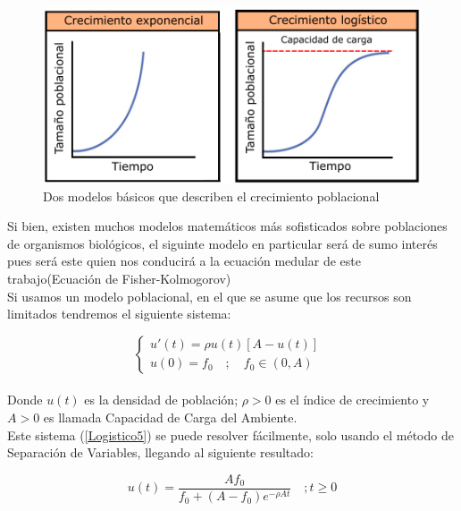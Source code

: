 \begin{center}
	\begin{figure}[H]
		\centering
		\includegraphics[scale=1]{marcoteorico/crecimientologistico.pdf}			
		\caption{{\small {\footnotesize Dos modelos básicos que describen el crecimiento poblacional}}}
	\end{figure}
\end{center}

Si bien, existen muchos modelos matemáticos más sofisticados sobre poblaciones de organismos biológicos, el siguinte modelo en particular será de sumo interés pues será este quien nos conducirá a la ecuación medular de este trabajo(Ecuación de Fisher-Kolmogorov)\\

Si usamos un modelo poblacional, en el que se asume que los recursos son limitados tendremos el siguiente sistema:

\begin{equation}
	\label{Logistico5}
	\begin{cases} u'(t)=\rho u(t)\left[ A-u(t) \right]  \\ u(0)={ f }_{ 0 }\quad ;{ \quad f }_{ 0 }\in \left( 0,A \right) \quad  \end{cases}
\end{equation}\\

Donde $u(t)$ es la densidad de población; $\rho>0 $ es el índice de crecimiento y $A>0$ es llamada Capacidad de Carga del Ambiente.\\

Este sistema (\ref{Logistico5}) se puede resolver fácilmente, solo usando el método de Separación de Variables, llegando al siguiente resultado:

\begin{equation}
	\label{Logistico6}
	u(t)=\dfrac { A{ f }_{ 0 } }{ { f }_{ 0 }+(A-{ f }_{ 0 }){ e }^{ -\rho At } } \quad ;t\ge 0
\end{equation}

